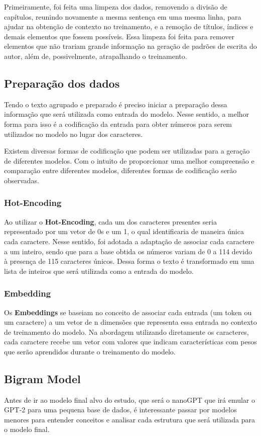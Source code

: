 \documentclass[9pt,technote]{IEEEtran}
\begin{document}
Primeiramente, foi feita uma limpeza dos dados, removendo a divisão de capítulos, reunindo novamente a mesma sentença em uma mesma linha, para ajudar na obtenção de contexto no treinamento, e a remoção de títulos, índices e demais elementos que fossem  possíveis. Essa limpeza foi feita para remover elementos que não trariam grande informação na geração de padrões de escrita do autor, além de, possivelmente, atrapalhando o treinamento. 

\subsection{Preparação dos dados}
Tendo o texto agrupado e preparado é preciso iniciar a preparação dessa informação que será utilizada como entrada do modelo. Nesse sentido, a melhor forma para isso é a codificação da entrada para obter números para serem utilizados no modelo no lugar dos caracteres.

Existem diversas formas de codificação que podem ser utilizadas para a geração de diferentes modelos. Com o intuito de proporcionar uma melhor compreensão e comparação entre diferentes modelos, diferentes formas de codificação serão observadas.

\subsubsection{Hot-Encoding}
Ao utilizar o \textbf{Hot-Encoding}, cada um dos caracteres presentes seria representado por um vetor de 0s e um 1, o qual identificaria de maneira única cada caractere. Nesse sentido, foi adotada a adaptação de associar cada caractere a um inteiro, sendo que para a base obtida os números variam de 0 a 114 devido à presença de 115 caracteres únicos. Dessa forma o texto é transformado em uma lista de inteiros que será utilizada como a entrada do modelo.

\subsubsection{Embedding}
Os \textbf{Embeddings} se baseiam no conceito de associar cada entrada (um token ou um caractere) a um vetor de n dimensões que representa essa entrada no contexto de treinamento do modelo. Na abordagem utilizando diretamente os caracteres, cada caractere recebe um vetor com valores que indicam características com pesos que serão aprendidos durante o treinamento do modelo.

\subsection{Bigram Model}
Antes de ir ao modelo final alvo do estudo, que será o nanoGPT que irá emular o GPT-2 para uma pequena base de dados, é interessante passar por modelos menores para entender conceitos e analisar cada estrutura que será utilizada para o modelo final.
\end{document}
